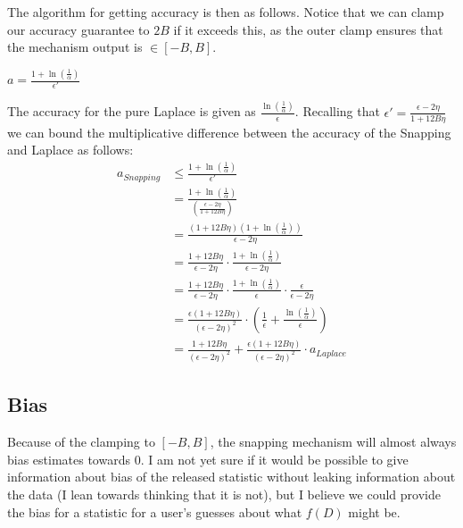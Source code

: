 \documentclass[11pt]{scrartcl} %
\begin{document}
The algorithm for getting accuracy is then as follows. Notice that we can clamp our accuracy guarantee to $2B$ if it
exceeds this, as the outer clamp ensures that the mechanism output is $\in [-B, B]$.
\begin{algorithm}
	\label{GetAccuracy2}
	\begin{algorithmic}
			\State $a = \frac{1 + \ln \left( \frac{1}{\alpha} \right)}{\epsilon'}$
					\State{}
			\Else{}
				\State{}
			\EndIf
		\EndFunction
	\end{algorithmic}
\end{algorithm}

The accuracy for the pure Laplace is given as $\frac{\ln \left( \frac{1}{\alpha} \right)}{\epsilon}$. Recalling that
$\epsilon' = \frac{\epsilon - 2\eta}{1 + 12B\eta}$ we can bound the multiplicative difference between the accuracy of the
Snapping and Laplace as follows:
\begin{align*}
	a_{Snapping} &\leq \frac{1 + \ln \left( \frac{1}{\alpha} \right)}{\epsilon'} \\
			     &= \frac{1 + \ln \left( \frac{1}{\alpha} \right)}{\left( \frac{\epsilon - 2\eta}{1 + 12B\eta} \right)} \\
			     &= \frac{(1 + 12B \eta) \left( 1 + \ln \left( \frac{1}{\alpha} \right) \right)}{\epsilon - 2\eta} \\
				 &= \frac{1 + 12B \eta}{\epsilon - 2\eta} \cdot \frac{1 + \ln \left( \frac{1}{\alpha} \right)}{\epsilon - 2\eta} \\
				 &= \frac{1 + 12B \eta}{\epsilon - 2\eta} \cdot \frac{1 + \ln \left( \frac{1}{\alpha} \right)}{\epsilon} \cdot \frac{\epsilon}{\epsilon - 2\eta} \\
				 &= \frac{\epsilon(1 + 12B \eta)}{\left( \epsilon - 2\eta \right)^2} \cdot \left( \frac{1}{\epsilon} + \frac{\ln \left( \frac{1}{\alpha} \right)}{\epsilon} \right) \\
				 &= \frac{1 + 12B \eta}{\left( \epsilon - 2\eta \right)^2}
				 + \frac{\epsilon(1 + 12B \eta)}{\left( \epsilon - 2\eta \right)^2} \cdot a_{Laplace}
\end{align*}

\subsection{Bias}
Because of the clamping to $[-B,B]$, the snapping mechanism will almost always bias estimates towards $0$.
I am not yet sure if it would be possible to give information about bias of the released statistic without leaking information
about the data (I lean towards thinking that it is not), but I believe we could provide the bias for a statistic for
a user's guesses about what $f(D)$ might be. \newline
\end{document}

